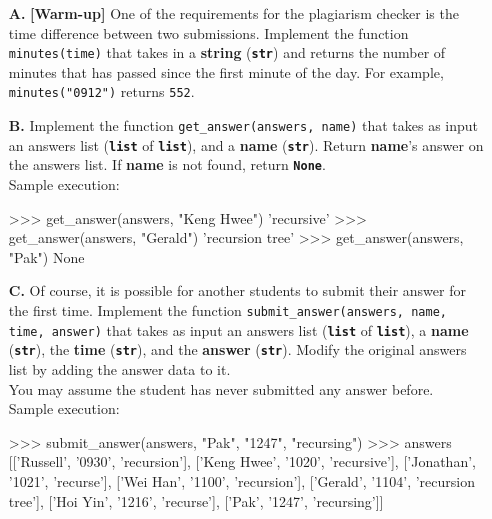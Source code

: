 \begin{enumerate}
\item[\textbf{A.}]
\textbf{[Warm-up]} One of the requirements for the plagiarism checker is the time difference between two submissions. Implement the 
function \colorbox{CornflowerBlue!20}{\texttt{minutes(time)}} that takes in a \textbf{string} (\colorbox{CornflowerBlue!20}{\texttt{\textbf{str}}}) 
and returns the number of minutes that has passed since the first minute of the day. For example, \texttt{minutes("0912")} returns \texttt{552}.
\begin{flushright}
    [2 marks]
\end{flushright}

\item[\textbf{B.}]
Implement the function \colorbox{CornflowerBlue!20}{\texttt{get\_answer(answers, name)}} that takes as input an answers list 
(\colorbox{CornflowerBlue!20}{\texttt{\textbf{list}}} of \colorbox{CornflowerBlue!20}{\texttt{\textbf{list}}}), and a \textbf{name} 
(\colorbox{CornflowerBlue!20}{\texttt{\textbf{str}}}). Return \textbf{name}'s answer on the answers list. If \textbf{name} is not found, return 
\colorbox{CornflowerBlue!20}{\texttt{\textbf{None}}}.\\
Sample execution:
\begin{python}
>>> get_answer(answers, "Keng Hwee")
'recursive'
>>> get_answer(answers, "Gerald")
'recursion tree'
>>> get_answer(answers, "Pak")
None
\end{python}
\begin{flushright}
    [2 marks]
\end{flushright}

\item[\textbf{C.}]
Of course, it is possible for another students to submit their answer for the first time. Implement the function \colorbox{CornflowerBlue!20}{\texttt{submit\_answer(answers, name, time, answer)}} 
that takes as input an answers list (\colorbox{CornflowerBlue!20}{\texttt{\textbf{list}}} of \colorbox{CornflowerBlue!20}{\texttt{\textbf{list}}}), a \textbf{name} 
(\colorbox{CornflowerBlue!20}{\texttt{\textbf{str}}}), the \textbf{time} (\colorbox{CornflowerBlue!20}{\texttt{\textbf{str}}}), and the \textbf{answer} 
(\colorbox{CornflowerBlue!20}{\texttt{\textbf{str}}}). Modify the original answers list by adding the answer data to it. \\
You may assume the student has never submitted any answer before. \\
Sample execution:
\begin{python}
>>> submit_answer(answers, "Pak", "1247", "recursing")
>>> answers
[['Russell', '0930', 'recursion'], ['Keng Hwee', '1020', 'recursive'],
 ['Jonathan', '1021', 'recurse'], ['Wei Han', '1100', 'recursion'],
 ['Gerald', '1104', 'recursion tree'], ['Hoi Yin', '1216', 'recurse'],
 ['Pak', '1247', 'recursing']]
\end{python}
\begin{flushright}
    [4 marks]
\end{flushright}


\end{enumerate}
